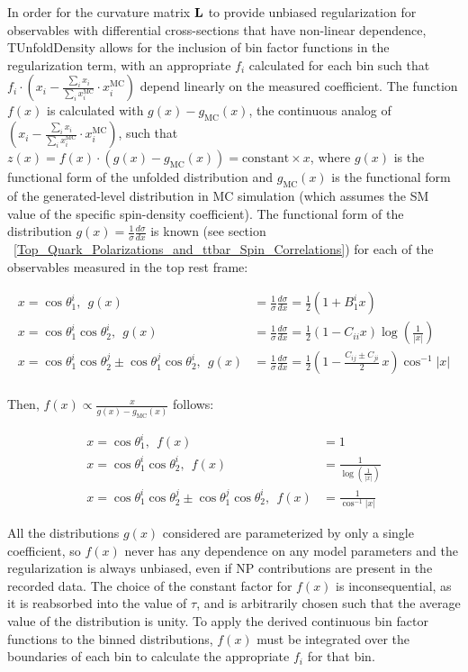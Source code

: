 In order for the curvature matrix $\mathbf{L}$ to provide unbiased regularization for observables with differential cross-sections that have non-linear dependence, TUnfoldDensity allows for the inclusion of bin factor functions in the regularization term, with an appropriate $f_i$ calculated for each bin such that $f_i \cdot (x_i - \frac{\sum_i x_i}{\sum_i x^{\text{MC}}_i} \cdot x^{\text{MC}}_i)$ depend linearly on the measured coefficient. 
The function $f(x)$ is calculated with $g(x) - g_{\text{MC}}(x)$, the continuous analog of $(x_i - \frac{\sum_i x_i}{\sum_i x^{\text{MC}}_i} \cdot x^{\text{MC}}_i)$, such that $z(x) = f(x) \cdot (g(x) - g_{\text{MC}}(x)) = \mathrm{constant} \times x$, where $g(x)$ is the functional form of the unfolded distribution and $g_{\text{MC}}(x)$ is the functional form of the generated-level distribution in MC simulation (which assumes the SM value of the specific spin-density coefficient).
The functional form of the distribution $g(x) = \tfrac{1}{\sigma}\tfrac{d\sigma}{dx}$ is known (see section ~\ref{Top_Quark_Polarizations_and_ttbar_Spin_Correlations}) for each of the observables measured in the top rest frame:
\begin{linenomath*}
\begin{align}
x=\cos\theta_1^i, \:\: g(x) &= \frac{1}{\sigma}\frac{d\sigma}{dx} = \frac{1}{2} (1+B_1^{i} x) \\ 
x=\cos\theta_1^i\cos\theta_2^i, \:\: g(x) &= \frac{1}{\sigma}\frac{d\sigma}{dx} = \frac{1}{2} (1-C_{ii} x) \log \left(\frac{1}{\left \vert x \right \vert }\right) \\ 
x=\cos\theta_1^i\cos\theta_2^j\pm \cos\theta_1^j\cos\theta_2^i, \:\: g(x) &= \frac{1}{\sigma}\frac{d\sigma}{dx} = \frac{1}{2} \left( 1 - \frac{C_{ij} \pm C_{ji}}{2} \, x \right)  \cos ^{-1}\left \vert x \right \vert \\
\end{align}
\end{linenomath*}
Then, $f(x) \propto \frac{x}{g(x)-g_{\text{MC}}(x)}$ follows:
\begin{linenomath*}
\begin{align}
x=\cos\theta_1^i, \:\: f(x) &= 1 \\
x=\cos\theta_1^i\cos\theta_2^i, \:\: f(x) &= \frac{1}{\log \left(\frac{1}{\left\vert x \right \vert }\right)} \\
x=\cos\theta_1^i\cos\theta_2^j\pm \cos\theta_1^j\cos\theta_2^i, \:\: f(x) &=  \frac{1}{\cos ^{-1}\left \vert x \right \vert}
\end{align}
\end{linenomath*}
All the distributions $g(x)$ considered are parameterized by only a single coefficient, so $f(x)$ never has any dependence on any model parameters and the regularization is always unbiased, even if NP contributions are present in the recorded data. 
The choice of the constant factor for $f(x)$ is inconsequential, as it is reabsorbed into the value of $\tau$, and is arbitrarily chosen such that the average value of the distribution is unity.
To apply the derived continuous bin factor functions to the binned distributions, $f(x)$ must be integrated over the boundaries of each bin to calculate the appropriate $f_i$ for that bin. 

